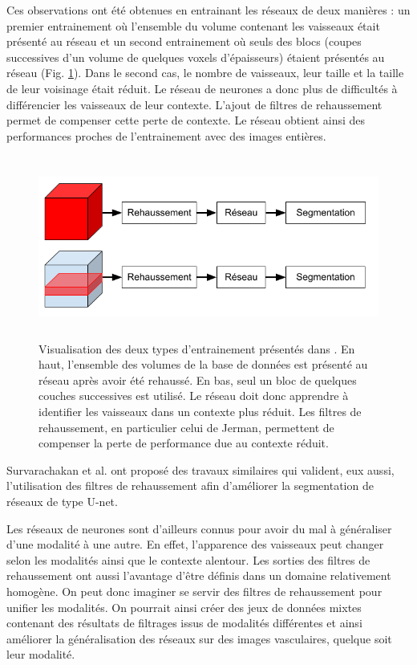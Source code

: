 Ces observations ont été obtenues en entrainant les réseaux de deux manières : un premier entrainement où l'ensemble du volume contenant les vaisseaux était présenté au réseau et un second entrainement où seuls des blocs (coupes successives d'un volume de quelques voxels d'épaisseurs) étaient présentés au réseau (Fig. \ref{fig:full_vs_slab}). Dans le second cas, le nombre de vaisseaux, leur taille et la taille de leur voisinage était réduit. Le réseau de neurones a donc plus de difficultés à différencier les vaisseaux de leur contexte. L'ajout de filtres de rehaussement permet de compenser cette perte de contexte. Le réseau obtient ainsi des performances proches de l'entrainement avec des images entières.

\begin{figure}[!ht]
    \centering
    \includegraphics[height=6cm]{Images/full_vs_slab.png}
    \caption{Visualisation des deux types d'entrainement présentés dans \cite{Affane_2022_article_commun}. En haut, l'ensemble des volumes de la base de données est présenté au réseau après avoir été rehaussé. En bas, seul un bloc de quelques couches successives est utilisé. Le réseau doit donc apprendre à identifier les vaisseaux dans un contexte plus réduit. Les filtres de rehaussement, en particulier celui de Jerman, permettent de compenser la perte de performance due au contexte réduit.}
    \label{fig:full_vs_slab}
  \end{figure}

Survarachakan et al. \cite{Survarachakan2021_deep_vesselness} ont proposé des travaux similaires qui valident, eux aussi, l'utilisation des filtres de rehaussement afin d'améliorer la segmentation de réseaux de type U-net.

Les réseaux de neurones sont d'ailleurs connus pour avoir du mal à généraliser d'une modalité à une autre. En effet, l'apparence des vaisseaux peut changer selon les modalités ainsi que le contexte alentour. Les sorties des filtres de rehaussement ont aussi l'avantage d'être définis dans un domaine relativement homogène. On peut donc imaginer se servir des filtres de rehaussement pour unifier les modalités. On pourrait ainsi créer des jeux de données mixtes contenant des résultats de filtrages issus de modalités différentes et ainsi améliorer la généralisation des réseaux sur des images vasculaires, quelque soit leur modalité.

